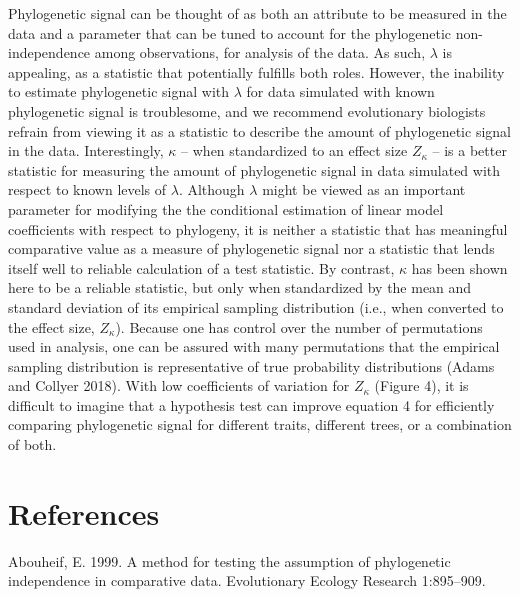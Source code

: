 \documentclass[
]{article}
\begin{document}
{Phylogenetic signal can be thought of as both an attribute to be
measured in the data and a parameter that can be tuned to account for
the phylogenetic non-independence among observations, for analysis of
the data. As such, \(\lambda\) is appealing, as a statistic that
potentially fulfills both roles. However, the inability to estimate
phylogenetic signal with \(\lambda\) for data simulated with known
phylogenetic signal is troublesome, and we recommend evolutionary
biologists refrain from viewing it as a statistic to describe the amount
of phylogenetic signal in the data. Interestingly, \(\kappa\) -- when
standardized to an effect size \(Z_\kappa\) -- is a better statistic for
measuring the amount of phylogenetic signal in data simulated with
respect to known levels of \(\lambda\). Although \(\lambda\) might be
viewed as an important parameter for modifying the the conditional
estimation of linear model coefficients with respect to phylogeny, it is
neither a statistic that has meaningful comparative value as a measure
of phylogenetic signal nor a statistic that lends itself well to
reliable calculation of a test statistic. By contrast, \(\kappa\) has
been shown here to be a reliable statistic, but only when standardized
by the mean and standard deviation of its empirical sampling
distribution (i.e., when converted to the effect size, \(Z_\kappa\)).
Because one has control over the number of permutations used in
analysis, one can be assured with many permutations that the empirical
sampling distribution is representative of true probability
distributions (Adams and Collyer 2018). With low coefficients of
variation for \(Z_\kappa\) (Figure 4), it is difficult to imagine that a
hypothesis test can improve equation 4 for efficiently comparing
phylogenetic signal for different traits, different trees, or a
combination of both.

\newpage

\hypertarget{references}{%
\section{References}\label{references}}

\setlength{\parindent}{-0.25in} \setlength{\leftskip}{0.25in}
\setlength{\parskip}{8pt} \noindent

\hypertarget{refs}{}
\leavevmode\hypertarget{ref-Abouheif1999}{}%
Abouheif, E. 1999. A method for testing the assumption of phylogenetic
independence in comparative data. Evolutionary Ecology Research
1:895--909.

}
\end{document}

